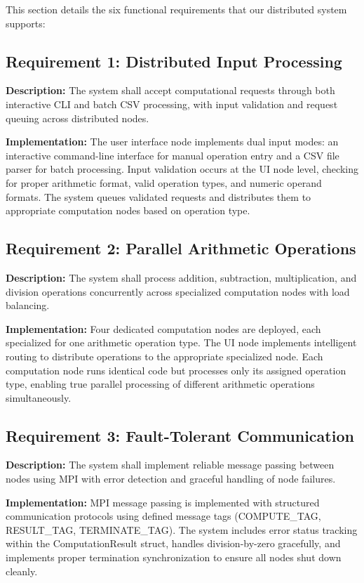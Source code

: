 \documentclass{article}
\begin{document}
This section details the six functional requirements that our distributed system supports:

\subsection{Requirement 1: Distributed Input Processing}
\textbf{Description:} 
The system shall accept computational requests through both interactive CLI and batch CSV processing, with input validation and request queuing across distributed nodes.

\textbf{Implementation:} 
The user interface node implements dual input modes: an interactive command-line interface for manual operation entry and a CSV file parser for batch processing. Input validation occurs at the UI node level, checking for proper arithmetic format, valid operation types, and numeric operand formats. The system queues validated requests and distributes them to appropriate computation nodes based on operation type.

\subsection{Requirement 2: Parallel Arithmetic Operations}
\textbf{Description:} 
The system shall process addition, subtraction, multiplication, and division operations concurrently across specialized computation nodes with load balancing.

\textbf{Implementation:} 
Four dedicated computation nodes are deployed, each specialized for one arithmetic operation type. The UI node implements intelligent routing to distribute operations to the appropriate specialized node. Each computation node runs identical code but processes only its assigned operation type, enabling true parallel processing of different arithmetic operations simultaneously.

\subsection{Requirement 3: Fault-Tolerant Communication}
\textbf{Description:} 
The system shall implement reliable message passing between nodes using MPI with error detection and graceful handling of node failures.

\textbf{Implementation:} 
MPI message passing is implemented with structured communication protocols using defined message tags (COMPUTE\_TAG, RESULT\_TAG, TERMINATE\_TAG). The system includes error status tracking within the ComputationResult struct, handles division-by-zero gracefully, and implements proper termination synchronization to ensure all nodes shut down cleanly.
\end{document}
